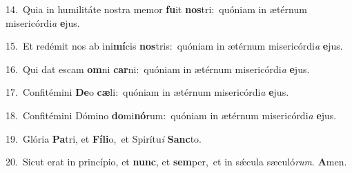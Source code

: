 {\numbfont\textcolor{\numbcolor}{14.}}~Quia in humilitáte nostra memor \textbf{fu}\-it \textbf{nos}\-tri:~\star quóniam in ætérnum misericórdi\textit{a} \textbf{e}\-jus.\par
{\numbfont\textcolor{\numbcolor}{15.}}~Et redémit nos ab ini\-\textbf{mí}\-cis \textbf{nos}\-tris:~\star quóniam in ætérnum misericórdi\textit{a} \textbf{e}\-jus.\par
{\numbfont\textcolor{\numbcolor}{16.}}~Qui dat escam \textbf{om}\-ni \textbf{car}\-ni:~\star quóniam in ætérnum misericórdi\textit{a} \textbf{e}\-jus.\par
{\numbfont\textcolor{\numbcolor}{17.}}~Confitémini \textbf{De}\-o \textbf{cæ}\-li:~\star quóniam in ætérnum misericórdi\textit{a} \textbf{e}\-jus.\par
{\numbfont\textcolor{\numbcolor}{18.}}~Confitémini Dómino \textbf{do}\-mi\-\textbf{nó}\-rum:~\star quóniam in ætérnum misericórdi\textit{a} \textbf{e}\-jus.\par
{\numbfont\textcolor{\numbcolor}{19.}}~Glória \textbf{Pa}\-tri, et \textbf{Fí}\-\textbf{li}o,~\star et Spirítu\textit{i} \textbf{Sanc}\-to.\par
{\numbfont\textcolor{\numbcolor}{20.}}~Sicut erat in princípio, et \textbf{nunc}\-, et \textbf{sem}\-per,~\star et in sǽcula sæculó\-\textit{rum}\-. \textbf{A}\-men.\par
